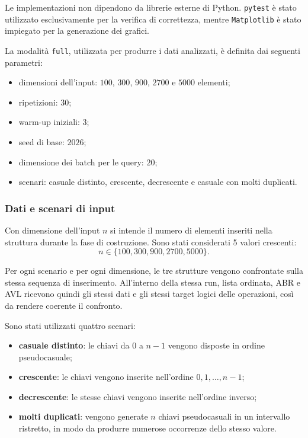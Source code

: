 \documentclass[a4paper,11pt]{article}
\begin{document}
Le implementazioni non dipendono da librerie esterne di Python. \texttt{pytest} è stato utilizzato esclusivamente per la verifica di correttezza, mentre \texttt{Matplotlib} è stato impiegato per la generazione dei grafici. 

La modalità \texttt{full}, utilizzata per produrre i dati analizzati, è definita dai seguenti parametri: 
\begin{itemize}
    \item dimensioni dell'input:
    $100$, $300$, $900$, $2700$ e $5000$ elementi;
    \item ripetizioni: $30$;
    \item warm-up iniziali: $3$;
    \item seed di base: $2026$;
    \item dimensione dei batch per le query: $20$;
    \item scenari: casuale distinto, crescente, decrescente e casuale
    con molti duplicati.
\end{itemize}


\subsubsection{Dati e scenari di input}
Con dimensione dell'input $n$ si intende il numero di elementi inseriti nella struttura durante la fase di costruzione. Sono stati considerati 5 valori crescenti: 
\[
n \in \{100, 300, 900, 2700, 5000\}.
\]

Per ogni scenario e per ogni dimensione, le tre strutture vengono confrontate sulla stessa sequenza di inserimento. All'interno della stessa run, lista ordinata, ABR e AVL ricevono quindi gli stessi dati e gli stessi target logici delle operazioni, così da rendere coerente il confronto. 

Sono stati utilizzati quattro scenari: 
\begin{itemize}
    \item \textbf{casuale distinto}: le chiavi da $0$ a $n-1$ vengono
    disposte in ordine pseudocasuale;

    \item \textbf{crescente}: le chiavi vengono inserite nell'ordine
    $0,1,\ldots,n-1$;

    \item \textbf{decrescente}: le stesse chiavi vengono inserite
    nell'ordine inverso;

    \item \textbf{molti duplicati}: vengono generate $n$ chiavi
    pseudocasuali in un intervallo ristretto, in modo da produrre
    numerose occorrenze dello stesso valore.
\end{itemize}
\end{document}
